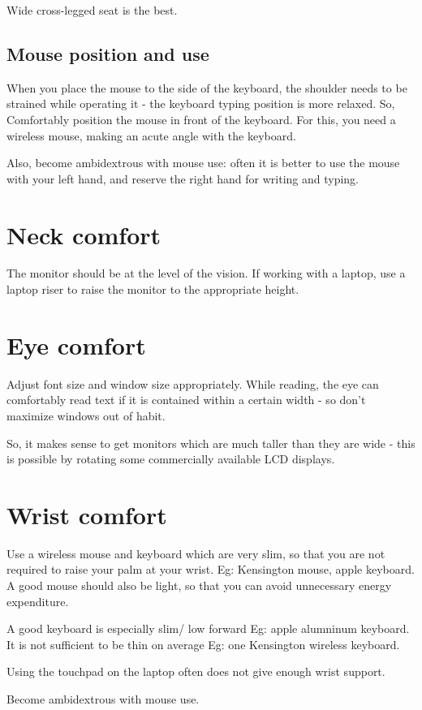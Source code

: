 \documentclass[oneside, article]{memoir}
\begin{document}
Wide cross-legged seat is the best.

\subsection{Mouse position and use}
When you place the mouse to the side of the keyboard, the shoulder needs to be strained while operating it - the keyboard typing position is more relaxed. So, Comfortably position the mouse in front of the keyboard. For this, you need a wireless mouse, making an acute angle with the keyboard.

Also, become ambidextrous with mouse use: often it is better to use the mouse with your left hand, and reserve the right hand for writing and typing.

\section{Neck comfort}
The monitor should be at the level of the vision. If working with a laptop, use a laptop riser to raise the monitor to the appropriate height.

\section{Eye comfort}
Adjust font size and window size appropriately. While reading, the eye can comfortably read text if it is contained within a certain width - so don't maximize windows out of habit.

So, it makes sense to get monitors which are much taller than they are wide - this is possible by rotating some commercially available LCD displays.

\section{Wrist comfort}
Use a wireless mouse and keyboard which are very slim, so that you are not required to raise your palm at your wrist. Eg: Kensington mouse, apple keyboard. A good mouse should also be light, so that you can avoid unnecessary energy expenditure.

A good keyboard is especially slim/ low forward Eg: apple alumninum keyboard. It is not sufficient to be thin on average Eg: one Kensington wireless keyboard.

Using the touchpad on the laptop often does not give enough wrist support.

Become ambidextrous with mouse use.
\end{document}
